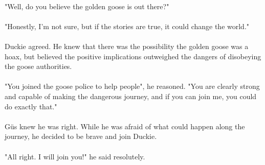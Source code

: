\paragraph{} "Well, do you believe the golden goose is out there?"
\paragraph{} "Honestly, I'm not sure, but if the stories are true, it could change the world."
\paragraph{} Duckie agreed. He knew that there was the possibility the golden goose was a hoax, but believed the positive implications outweighed the dangers of disobeying the goose authorities. 
\paragraph{} "You joined the goose police to help people", he reasoned. "You are clearly strong and capable of making the dangerous journey, and if you can join me, you could do exactly that."
\paragraph{} Güs knew he was right. While he was afraid of what could happen along the journey, he decided to be brave and join Duckie. 
\paragraph{} "All right. I will join you!" he said resolutely. 